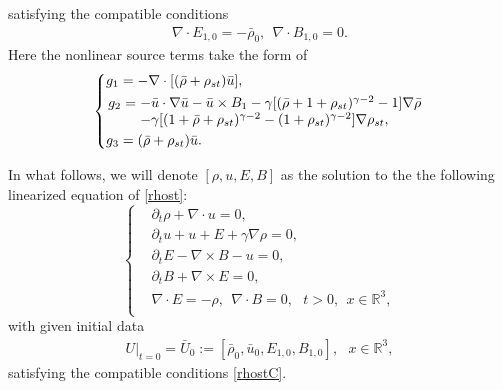 \documentclass[11pt]{amsart}
\numberwithin{equation}{section}
\begin{document}
satisfying the compatible conditions
\begin{eqnarray}\label{rhostC}
\nabla \cdot E_{1,0}=-\bar{\rho}_{0}, \ \  \nabla \cdot B_{1,0}=0.
\end{eqnarray}
Here the nonlinear source terms take the form of
\begin{equation}\label{sec5.ggg}
\arraycolsep=1.5pt \left\{
 \begin{aligned}
 & g_{1}=-\nabla\cdot[(\bar{\rho}+\rho_{st}) \bar{u}],\\
 &\begin{array}[b]{rcl}
  g_{2}&=&-\bar{u} \cdot \nabla \bar{u}-\bar{u}\times B_{1}
  -\gamma [(\bar{\rho}+1+\rho_{st})^{\gamma-2}-1]\nabla\bar{\rho}\\
  &&-\gamma
  [(1+\bar{\rho}+\rho_{st})^{\gamma-2}-(1+\rho_{st})^{\gamma-2}]\nabla\rho_{st},
  \end{array}\\
 & g_{3}=(\bar{\rho}+\rho_{st}) \bar{u}.
\end{aligned}\right.
\end{equation}

In what follows, we will denote $[\rho,u,E,B]$ as the solution to
the  the following linearized equation of \eqref{rhost}:
\begin{equation}\label{DJ}
\left\{
  \begin{aligned}
  &\partial_t \rho+\nabla\cdot u=0,\\
  &\partial_t u+u+ E +\gamma \nabla\rho=0,\\
  &\partial_t E-\nabla\times B-u=0,\\
  &\partial_t B+\nabla \times E=0,\\
  &\nabla \cdot E=-\rho, \ \  \nabla \cdot B=0, \ \ \ t>0, \ \ x\in\mathbb{R}^{3},\\
\end{aligned}\right.
\end{equation}
with given initial data
\begin{eqnarray}\label{2.61}
U|_{t=0}=\bar{U}_{0}:=[\bar{\rho}_{0},\bar{u}_{0},E_{1,0},B_{1,0}],
\ \ \ x\in\mathbb{R}^{3},
\end{eqnarray}
satisfying the compatible conditions \eqref{rhostC}.
\end{document}
